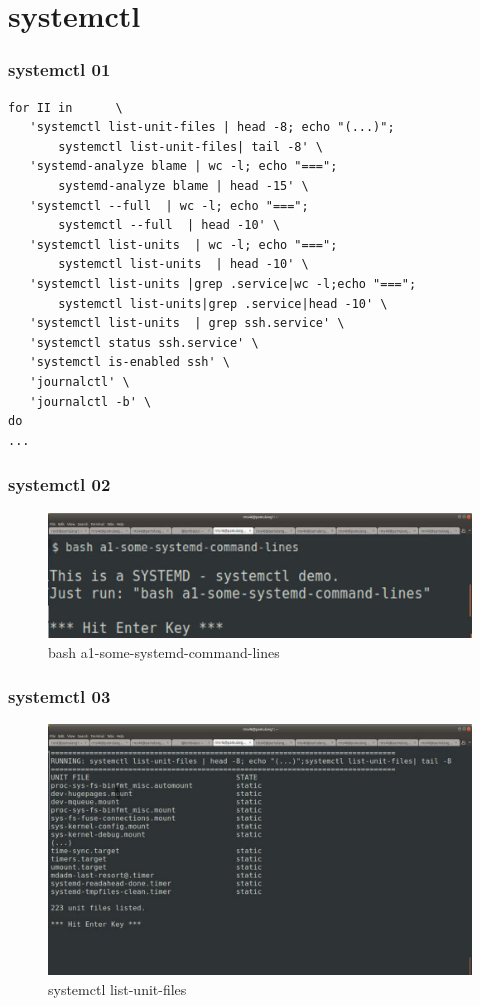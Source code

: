 \documentclass[aspectratio=169, xcolor=table, notheorems, hyperref={pdfpagelabels=false}]{beamer}
\begin{document}
\section{systemctl}
\begin{frame}[fragile]
\frametitle{systemctl 01}
\begin{lstlisting}[basicstyle=\ttfamily\small]
for II in      \
   'systemctl list-unit-files | head -8; echo "(...)";
       systemctl list-unit-files| tail -8' \
   'systemd-analyze blame | wc -l; echo "===";
       systemd-analyze blame | head -15' \
   'systemctl --full  | wc -l; echo "===";
       systemctl --full  | head -10' \
   'systemctl list-units  | wc -l; echo "===";
       systemctl list-units  | head -10' \
   'systemctl list-units |grep .service|wc -l;echo "===";
       systemctl list-units|grep .service|head -10' \
   'systemctl list-units  | grep ssh.service' \
   'systemctl status ssh.service' \
   'systemctl is-enabled ssh' \
   'journalctl' \
   'journalctl -b' \
do
...
\end{lstlisting}

\end{frame}

\begin{frame}[fragile]
\frametitle{systemctl 02}
\begin{figure}
\includegraphics[width=.93\linewidth]{os-systemd01.jpg}
\caption{bash a1-some-systemd-command-lines}
\end{figure}
\end{frame}

\begin{frame}[fragile]
\frametitle{systemctl 03}
\begin{figure}
\includegraphics[width=.74\linewidth]{os-systemd02.jpg}
\caption{systemctl list-unit-files}
\end{figure}
\end{frame}
\end{document}
